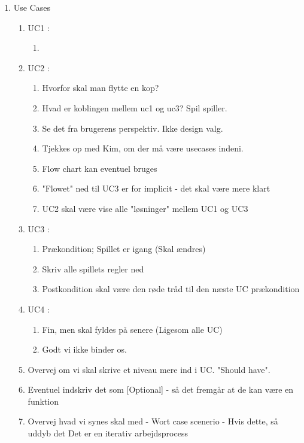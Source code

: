  \begin{enumerate}
    \item Use Cases
    \begin{enumerate}
        \item UC1 : 
        \begin{enumerate}
            \item 
        \end{enumerate}
        
        \item UC2 : 
        \begin{enumerate}
            \item Hvorfor skal man flytte en kop?
            \item Hvad er koblingen mellem uc1 og uc3? Spil spiller.
            \item Se det fra brugerens perspektiv. Ikke design valg.
            \item Tjekkes op med Kim, om der må være usecases indeni.
            \item Flow chart kan eventuel bruges
            \item "Flowet" ned til UC3 er for implicit - det skal være mere klart 
            \item UC2 skal være vise alle "løsninger" mellem UC1 og UC3
        \end{enumerate}
        
        \item UC3 : 
        \begin{enumerate}
            \item Prækondition; Spillet er igang (Skal ændres) 
            \item Skriv alle spillets regler ned
            \item Postkondition skal være den røde tråd til den næste UC prækondition 
        \end{enumerate}
        
        \item UC4 : 
        \begin{enumerate}
            \item Fin, men skal fyldes på senere (Ligesom alle UC) 
            \item Godt vi ikke binder os.
            
        \end{enumerate}
        \item Overvej om vi skal skrive et niveau mere ind i UC. "Should have".
        \item Eventuel indskriv det som [Optional] - så det fremgår at de kan være en funktion
        \item Overvej hvad vi synes skal med - Wort case scenerio - Hvis dette, så uddyb det
        Det er en iterativ arbejdsprocess 
    \end{enumerate}


\end{enumerate}
